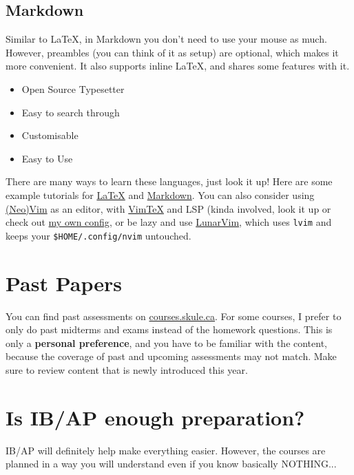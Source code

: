 \subsection{Markdown}

Similar to \LaTeX, in Markdown you don't need to use your mouse as much. However, preambles (you can think of it as setup) are optional, which makes it more convenient. It also supports inline \LaTeX, and shares some features with it.

\begin{itemize}
    \item Open Source Typesetter
    \item Easy to search through
    \item Customisable
    \item Easy to Use
\end{itemize}

There are many ways to learn these languages, just look it up! Here are some example tutorials for \href{https://www.overleaf.com/learn/latex/Learn_LaTeX_in_30_minutes}{\LaTeX} and \href{https://www.markdowntutorial.com/}{Markdown}. You can also consider using \href{https://neovim.io/}{(Neo)Vim} as an editor, with \href{https://github.com/lervag/vimtex}{VimTeX} and LSP (kinda involved, look it up or check out \href{https://github.com/latexsupremecist/Misc/blob/main/configurations/init.vim}{my own config}, or be lazy and use \href{https://www.lunarvim.org/}{LunarVim}, which uses \verb|lvim| and keeps your \verb|$HOME/.config/nvim| untouched.

\section{Past Papers}

You can find past assessments on \url{courses.skule.ca}. For some courses, I prefer to only do past midterms and exams instead of the homework questions. This is only a \textbf{personal preference}, and you have to be familiar with the content, because the coverage of past and upcoming assessments may not match. Make sure to review content that is newly introduced this year.

\section{Is IB/AP enough preparation?}

IB/AP will definitely help make everything easier. However, the courses are planned in a way you will understand even if you know basically NOTHING...


